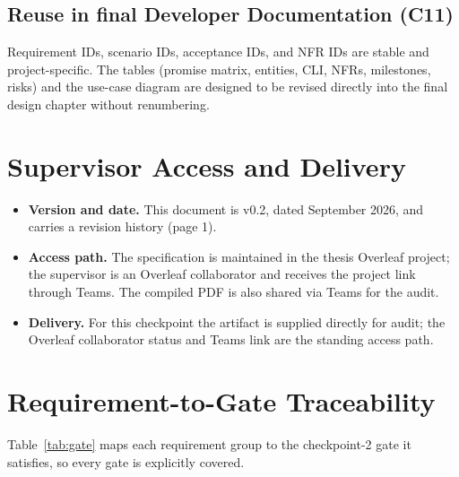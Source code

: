 \documentclass[12pt,a4paper]{article}
\begin{document}
\subsection{Reuse in final Developer Documentation (C11)}

Requirement IDs, scenario IDs, acceptance IDs, and NFR IDs are stable and project-specific. The tables (promise matrix, entities, CLI, NFRs, milestones, risks) and the use-case diagram are designed to be revised directly into the final design chapter without renumbering.

\section{Supervisor Access and Delivery}

\begin{itemize}
  \item \textbf{Version and date.} This document is v0.2, dated September 2026, and carries a revision history (page 1).
  \item \textbf{Access path.} The specification is maintained in the thesis Overleaf project; the supervisor is an Overleaf collaborator and receives the project link through Teams. The compiled PDF is also shared via Teams for the audit.
  \item \textbf{Delivery.} For this checkpoint the artifact is supplied directly for audit; the Overleaf collaborator status and Teams link are the standing access path.
\end{itemize}

\section{Requirement-to-Gate Traceability}

Table~\ref{tab:gate} maps each requirement group to the checkpoint-2 gate it satisfies, so every gate is explicitly covered.
\end{document}

